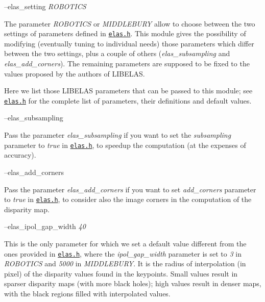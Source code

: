 --elas\+\_\+setting {\itshape R\+O\+B\+O\+T\+I\+C\+S} 
\begin{DoxyItemize}
\item The parameter {\itshape R\+O\+B\+O\+T\+I\+C\+S} or {\itshape M\+I\+D\+D\+L\+E\+B\+U\+R\+Y} allow to choose between the two settings of parameters defined in \href{https://github.com/robotology/stereo-vision/tree/master/lib/elas/include/elas.h}{\tt elas.\+h}. This module gives the possibility of modifying (eventually tuning to individual needs) those parameters which differ between the two settings, plus a couple of others ({\itshape elas\+\_\+subsampling} and {\itshape elas\+\_\+add\+\_\+corners}). The remaining parameters are supposed to be fixed to the values proposed by the authors of L\+I\+B\+E\+L\+A\+S.
\end{DoxyItemize}

Here we list those L\+I\+B\+E\+L\+A\+S parameters that can be passed to this module; see \href{https://github.com/robotology/stereo-vision/tree/master/lib/elas/include/elas.h}{\tt elas.\+h} for the complete list of parameters, their definitions and default values.

--elas\+\_\+subsampling
\begin{DoxyItemize}
\item Pass the parameter {\itshape elas\+\_\+subsampling} if you want to set the {\itshape subsampling} parameter to {\itshape true} in \href{https://github.com/robotology/stereo-vision/tree/master/lib/elas/include/elas.h}{\tt elas.\+h}, to speedup the computation (at the expenses of accuracy).
\end{DoxyItemize}

--elas\+\_\+add\+\_\+corners
\begin{DoxyItemize}
\item Pass the parameter {\itshape elas\+\_\+add\+\_\+corners} if you want to set {\itshape add\+\_\+corners} parameter to {\itshape true} in \href{https://github.com/robotology/stereo-vision/tree/master/lib/elas/include/elas.h}{\tt elas.\+h}, to consider also the image corners in the computation of the disparity map.
\end{DoxyItemize}

--elas\+\_\+ipol\+\_\+gap\+\_\+width {\itshape 40} 
\begin{DoxyItemize}
\item This is the only parameter for which we set a default value different from the ones provided in \href{https://github.com/robotology/stereo-vision/tree/master/lib/elas/include/elas.h}{\tt elas.\+h}, where the {\itshape ipol\+\_\+gap\+\_\+width} parameter is set to {\itshape 3} in {\itshape R\+O\+B\+O\+T\+I\+C\+S} and {\itshape 5000} in {\itshape M\+I\+D\+D\+L\+E\+B\+U\+R\+Y}. It is the radius of interpolation (in pixel) of the disparity values found in the keypoints. Small values result in sparser disparity maps (with more black holes); high values result in denser maps, with the black regions filled with interpolated values.
\end{DoxyItemize}

